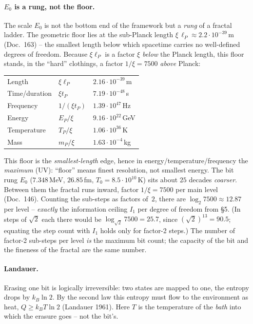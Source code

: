 \paragraph{$E_0$ is a rung, not the floor.} The scale $E_0$ is not the bottom end of the framework but a
\emph{rung} of a fractal ladder. The geometric floor lies at the sub-Planck length
$\xi\,\ell_P\approx2.2\cdot10^{-39}$\,m (Doc.~163) -- the smallest length below which spacetime carries no
well-defined degrees of freedom. Because $\xi\ell_P$ is a factor $\xi$ \emph{below} the Planck length,
this floor stands, in the \enquote{hard} clothings, a factor $1/\xi=7500$ \emph{above} Planck:
\begin{center}
\begin{tabular}{@{}lll@{}}
Length & $\xi\ell_P$ & $2.16\cdot10^{-39}$\,m\\
Time/duration & $\xi t_P$ & $7.19\cdot10^{-48}$\,s\\
Frequency & $1/(\xi t_P)$ & $1.39\cdot10^{47}$\,Hz\\
Energy & $E_P/\xi$ & $9.16\cdot10^{22}$\,GeV\\
Temperature & $T_P/\xi$ & $1.06\cdot10^{36}$\,K\\
Mass & $m_P/\xi$ & $1.63\cdot10^{-4}$\,kg\\
\end{tabular}
\end{center}
This floor is the \emph{smallest-length} edge, hence in energy/temperature/frequency the \emph{maximum}
(UV): \enquote{floor} means finest resolution, not smallest energy. The bit rung $E_0$ ($7.348$\,MeV,
$26.85$\,fm, $T_0=8.5\cdot10^{10}$\,K) sits about $25$ decades \emph{coarser}. Between them the fractal
runs inward, factor $1/\xi=7500$ per main level (Doc.~146). Counting the sub-steps as factors of~$2$,
there are $\log_2 7500\approx12.87$ per level -- \emph{exactly} the information ceiling $I_1$ per degree
of freedom from \S5. (In steps of $\sqrt2$ each there would be $\log_{\sqrt2}7500=25.7$, since
$(\sqrt2)^{13}=90.5$; equating the step count with $I_1$ holds only for factor-2 steps.) The number of
factor-2 sub-steps per level \emph{is} the maximum bit count; the capacity of the bit and the fineness of
the fractal are the same number.

\paragraph{Landauer.} Erasing one bit is logically irreversible: two states are mapped to one, the entropy
drops by $k_B\ln2$. By the second law this entropy must flow to the environment as heat, $Q\ge k_B T\ln2$
(Landauer 1961). Here $T$ is the temperature of the \emph{bath} into which the erasure goes -- not the
bit's.

